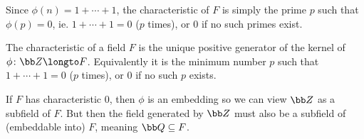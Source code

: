 Since $\phi(n)=1+\cdots+1$, the characteristic of $F$ is simply the prime $p$ such that $\phi(p)=0$, ie. $1+\cdots+1=0$ ($p$ times), or $0$ if no such primes exist.

\bdefn

    The {\emphcolor characteristic} of a field $F$ is the unique positive generator of the kernel of $\phi\colon{\bb Z}\longto F$.
    Equivalently it is the minimum number $p$ such that $1+\cdots+1=0$ ($p$ times), or $0$ if no such $p$ exists.

\edefn

If $F$ has characteristic $0$, then $\phi$ is an embedding so we can view ${\bb Z}$ as a subfield of $F$.
But then the field generated by ${\bb Z}$ must also be a subfield of (embeddable into) $F$, meaning ${\bb Q}\subseteq F$.

